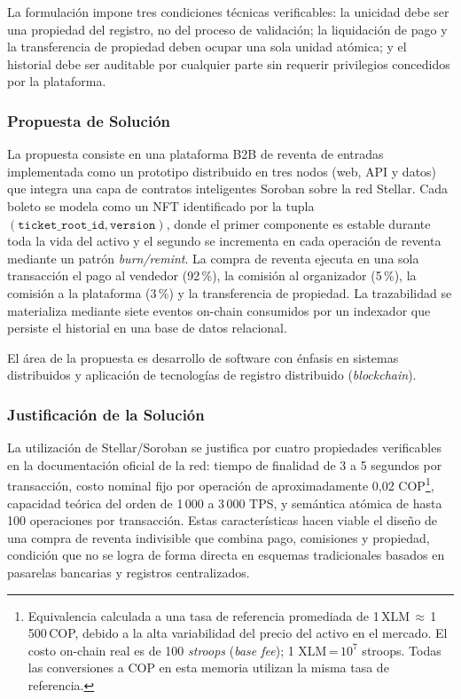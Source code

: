 La formulación impone tres condiciones técnicas verificables: la unicidad debe ser una propiedad del registro, no del proceso de validación; la liquidación de pago y la transferencia de propiedad deben ocupar una sola unidad atómica; y el historial debe ser auditable por cualquier parte sin requerir privilegios concedidos por la plataforma.

\subsubsection{Propuesta de Solución}

La propuesta consiste en una plataforma B2B de reventa de entradas implementada como un prototipo distribuido en tres nodos (web, API y datos) que integra una capa de contratos inteligentes Soroban sobre la red Stellar. Cada boleto se modela como un NFT identificado por la tupla \((\texttt{ticket\_root\_id}, \texttt{version})\), donde el primer componente es estable durante toda la vida del activo y el segundo se incrementa en cada operación de reventa mediante un patrón \textit{burn/remint}. La compra de reventa ejecuta en una sola transacción el pago al vendedor (92\,\%), la comisión al organizador (5\,\%), la comisión a la plataforma (3\,\%) y la transferencia de propiedad. La trazabilidad se materializa mediante siete eventos on-chain consumidos por un indexador que persiste el historial en una base de datos relacional.

El área de la propuesta es desarrollo de software con énfasis en sistemas distribuidos y aplicación de tecnologías de registro distribuido (\textit{blockchain}).

\subsubsection{Justificación de la Solución}

La utilización de Stellar/Soroban se justifica por cuatro propiedades verificables en la documentación oficial de la red: tiempo de finalidad de 3 a 5 segundos por transacción, costo nominal fijo por operación de aproximadamente 0{,}02 COP\footnote{Equivalencia calculada a una tasa de referencia promediada de 1\,XLM\,$\approx$\,1\,500\,COP, debido a la alta variabilidad del precio del activo en el mercado. El costo on-chain real es de 100 \textit{stroops} (\textit{base fee}); 1 XLM\,=\,$10^{7}$ stroops. Todas las conversiones a COP en esta memoria utilizan la misma tasa de referencia.}, capacidad teórica del orden de 1\,000 a 3\,000 TPS, y semántica atómica de hasta 100 operaciones por transacción. Estas características hacen viable el diseño de una compra de reventa indivisible que combina pago, comisiones y propiedad, condición que no se logra de forma directa en esquemas tradicionales basados en pasarelas bancarias y registros centralizados.

